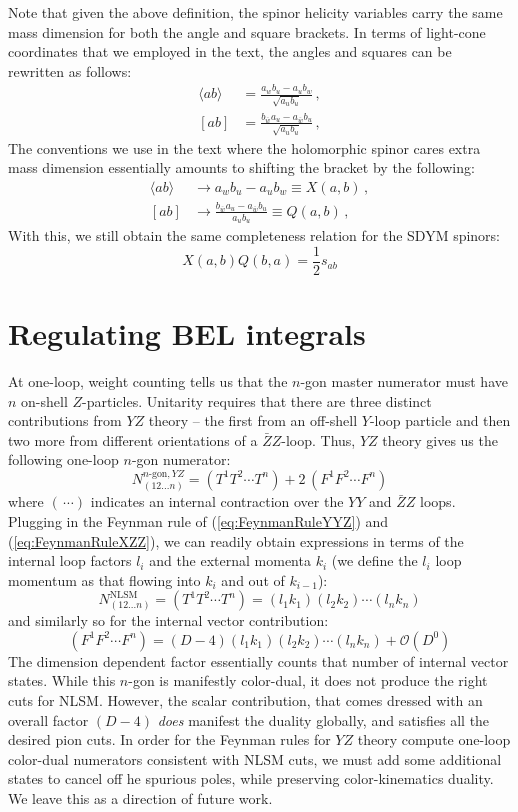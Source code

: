 \documentclass[11pt,letter]{article}
\def\eqn#1{(\ref{#1})}
\def\be{\begin{equation}}
\def\ee{\end{equation}}
\begin{document}
Note that given the above definition, the spinor helicity variables carry the same mass dimension for both the angle and square brackets. In terms of light-cone coordinates that we employed in the text, the angles and squares can be rewritten as follows:
\begin{align}
\langle ab \rangle &= \frac{a_w b_u-a_u b_w}{\sqrt{a_ub_u}}\,,
\\
[ab] &= \frac{b_{\bar{w}}a_u-a_{\bar{w}}b_u}{\sqrt{a_ub_u}}\,,
\end{align}
The conventions we use in the text where the holomorphic spinor cares extra mass dimension essentially amounts to shifting the bracket by the following:
\begin{align}
\langle ab \rangle &\rightarrow a_w b_u-a_u b_w \equiv X(a,b)\,,
\\
[ab] &\rightarrow \frac{b_{\bar{w}}a_u-a_{\bar{w}}b_u}{a_ub_u}\equiv Q(a,b)\,,
\end{align}
With this, we still obtain the same completeness relation for the SDYM spinors:
\be
X(a,b)Q(b,a) = \frac{1}{2}s_{ab}
\ee
\section{Regulating BEL integrals}
At one-loop, weight counting tells us that the $n$-gon master numerator must have $n$ on-shell $Z$-particles. Unitarity requires that there are three distinct contributions from $Y\!Z$ theory -- the first from an off-shell $Y$-loop particle and then two more from different orientations of a $\bar{Z}Z$-loop.  Thus, $Y\!Z$ theory gives us the following one-loop $n$-gon numerator:
\be
N^{n\text{-gon},YZ}_{(12...n)} = (T^{1}T^{2}\cdots T^{n})+2\, (F^1F^2\cdots F^n)
\ee
where $(\,\cdots)$ indicates an internal contraction over the $YY$ and $\bar{Z}Z$ loops. Plugging in the Feynman rule of \eqn{eq:FeynmanRuleYYZ} and \eqn{eq:FeynmanRuleXZZ}, we can readily obtain expressions in terms of the internal loop factors $l_i$ and the external momenta $k_i$ (we define the $l_i$ loop momentum as that flowing into $k_i$ and out of $k_{i-1}$):
\be
N_{(12...n)}^{\text{NLSM}}=(T^{1}T^{2}\cdots T^{n}) = (l_1 k_1)(l_2 k_2) \cdots (l_n k_n)
\ee
and similarly so for the internal vector contribution:
\be
 (F^1F^2\cdots F^n) = (D-4)(l_1 k_1)(l_2 k_2) \cdots (l_n k_n) + \mathcal{O}(D^0)
\ee
The dimension dependent factor essentially counts that number of internal vector states. While this $n$-gon is manifestly color-dual, it does not produce the right cuts for NLSM. However, the scalar contribution, that comes dressed with an overall factor $(D-4)$ \textit{does} manifest the duality globally, and satisfies all the desired pion cuts. In order for the Feynman rules for $Y\!Z$ theory compute one-loop color-dual numerators consistent with NLSM cuts, we must add some additional states to cancel off he spurious poles, while preserving color-kinematics duality. We leave this as a direction of future work. 
\end{document}
